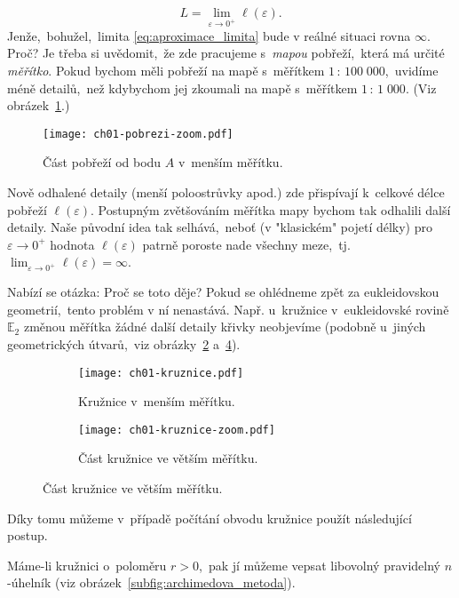 \begin{equation}\label{eq:aproximace_limita}
    L=\lim_{\varepsilon\to0^+}{\ell(\varepsilon)}.
\end{equation}
Jenže,~bohužel,~limita \eqref{eq:aproximace_limita} bude v reálné situaci rovna $\infty$. Proč? Je třeba si uvědomit,~že zde pracujeme s~\emph{mapou} pobřeží,~která má určité \emph{měřítko}. Pokud bychom měli pobřeží na mapě s~měřítkem $1\,:\,100\;000$,~uvidíme méně detailů,~než kdybychom jej zkoumali na mapě s~měřítkem $1\,:\,1\;000$. (Viz obrázek~\ref{fig:pobrezi_zoom}.)\par
\begin{figure}[h]
    \centering
    \texttt{[image: ch01-pobrezi-zoom.pdf]}
    \caption{Část pobřeží od bodu $A$ v~menším měřítku.}
    \label{fig:pobrezi_zoom}
\end{figure}
Nově odhalené detaily (menší poloostrůvky apod.) zde přispívají k~celkové délce pobřeží $\ell(\varepsilon)$. Postupným zvětšováním měřítka mapy bychom tak odhalili další detaily. Naše původní idea tak selhává,~neboť (v "klasickém" pojetí délky) pro $\varepsilon\to0^+$ hodnota $\ell(\varepsilon)$ patrně poroste nade všechny meze,~tj. $\lim_{\varepsilon\to0^+}{\ell(\varepsilon)}=\infty$.\par
Nabízí se otázka: Proč se toto děje? Pokud se ohlédneme zpět za eukleidovskou geometrií,~tento problém v ní nenastává. Např. u~kružnice v~eukleidovské rovině $\mathbb{E}_2$ změnou měřítka žádné další detaily křivky neobjevíme (podobně u~jiných geometrických útvarů,~viz obrázky~\ref{subfig:kruznice} a~\ref{subfig:kruznice_zoom}). 
\begin{figure}[h]
    \centering
    \begin{subfigure}{\subfigwidth}
        \centering
        \texttt{[image: ch01-kruznice.pdf]}
        \caption{Kružnice v~menším měřítku.}
        \label{subfig:kruznice}
    \end{subfigure}
    \quad
    \begin{subfigure}{\subfigwidth}
        \centering
        \texttt{[image: ch01-kruznice-zoom.pdf]}
        \caption{Část kružnice ve větším měřítku.}
        \label{subfig:kruznice_zoom}
    \end{subfigure}
\end{figure}
Díky tomu můžeme v~případě počítání obvodu kružnice použít následující postup.\par
Máme-li kružnici o~poloměru $r>0$,~pak jí můžeme vepsat libovolný pravidelný $n$-úhelník (viz obrázek~\ref{subfig:archimedova_metoda}).

